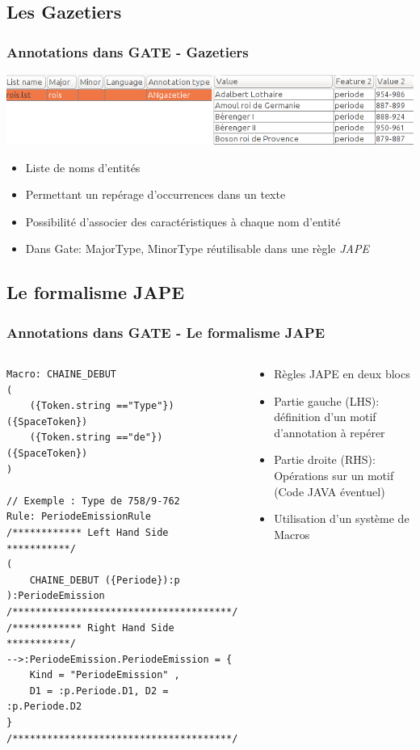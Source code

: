 \documentclass[10pt, compress]{beamer}
\begin{document}
\subsection{Les Gazetiers}
\begin{frame}[fragile]
\frametitle{Annotations dans GATE - Gazetiers}
	\includegraphics[scale=0.4]{img/gazetier.png} 
		\begin{itemize}[<+->]
			\item{Liste de noms d'entités}
			\item{Permettant un repérage d’occurrences dans un texte}
			\item{Possibilité d'associer des caractéristiques à chaque nom d'entité}
			\item{Dans Gate: MajorType, MinorType réutilisable dans une règle \textit{JAPE}}
		\end{itemize}
\end{frame}

\subsection{Le formalisme JAPE}
\begin{frame}[fragile]
\frametitle{Annotations dans GATE - Le formalisme JAPE}
\begin{columns}
	\begin{scriptsize}
\begin{lstlisting}
Macro: CHAINE_DEBUT
(
    ({Token.string =="Type"})({SpaceToken})
    ({Token.string =="de"})({SpaceToken})
)

// Exemple : Type de 758/9-762
Rule: PeriodeEmissionRule
/************ Left Hand Side ***********/
(
    CHAINE_DEBUT ({Periode}):p
):PeriodeEmission
/**************************************/
/************ Right Hand Side ***********/
-->:PeriodeEmission.PeriodeEmission = {
 	Kind = "PeriodeEmission" ,
 	D1 = :p.Periode.D1, D2 = :p.Periode.D2
}
/**************************************/
\end{lstlisting}
\end{scriptsize}
	\begin{scriptsize}
	\begin{itemize}
	[square]
	\item{Règles JAPE en deux blocs}
	\item{Partie gauche (LHS): définition d'un motif d'annotation à repérer}
	\item{Partie droite (RHS): Opérations sur un motif (Code JAVA éventuel)}
	\item{Utilisation d'un système de Macros}
	\end{itemize}
	\end{scriptsize}
\end{columns}
\end{frame}
\end{document}
